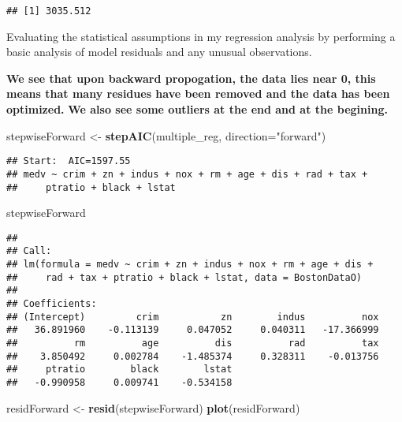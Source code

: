 \documentclass[]{article}
\newenvironment{Shaded}{\begin{snugshade}}{\end{snugshade}}
\newcommand{\DataTypeTok}[1]{\textcolor[rgb]{0.13,0.29,0.53}{#1}}
\newcommand{\KeywordTok}[1]{\textcolor[rgb]{0.13,0.29,0.53}{\textbf{#1}}}
\newcommand{\NormalTok}[1]{#1}
\newcommand{\StringTok}[1]{\textcolor[rgb]{0.31,0.60,0.02}{#1}}
\begin{document}
\begin{verbatim}
## [1] 3035.512
\end{verbatim}

\item

Evaluating the statistical assumptions in my regression analysis by
performing a basic analysis of model residuals and any unusual
observations.

\textbf{We see that upon backward propogation, the data lies near 0,
this means that many residues have been removed and the data has been
optimized.} \textbf{We also see some outliers at the end and at the
begining.}

\begin{Shaded}
\begin{Highlighting}[]
\NormalTok{stepwiseForward <-}\StringTok{ }\KeywordTok{stepAIC}\NormalTok{(multiple_reg, }\DataTypeTok{direction=}\StringTok{"forward"}\NormalTok{)}
\end{Highlighting}
\end{Shaded}

\begin{verbatim}
## Start:  AIC=1597.55
## medv ~ crim + zn + indus + nox + rm + age + dis + rad + tax + 
##     ptratio + black + lstat
\end{verbatim}

\begin{Shaded}
\begin{Highlighting}[]
\NormalTok{stepwiseForward}
\end{Highlighting}
\end{Shaded}

\begin{verbatim}
## 
## Call:
## lm(formula = medv ~ crim + zn + indus + nox + rm + age + dis + 
##     rad + tax + ptratio + black + lstat, data = BostonDataO)
## 
## Coefficients:
## (Intercept)         crim           zn        indus          nox  
##   36.891960    -0.113139     0.047052     0.040311   -17.366999  
##          rm          age          dis          rad          tax  
##    3.850492     0.002784    -1.485374     0.328311    -0.013756  
##     ptratio        black        lstat  
##   -0.990958     0.009741    -0.534158
\end{verbatim}

\begin{Shaded}
\begin{Highlighting}[]
\NormalTok{residForward <-}\StringTok{ }\KeywordTok{resid}\NormalTok{(stepwiseForward)}
\KeywordTok{plot}\NormalTok{(residForward)}
\end{Highlighting}
\end{Shaded}
\end{document}
